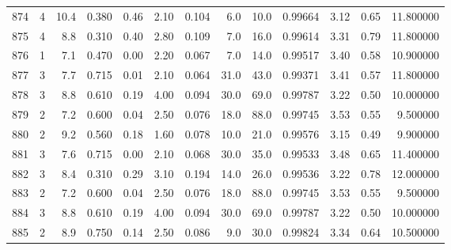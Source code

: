 \begin{tabular}{lrrrrrrrrrrrr}
874  &        4 &           10.4 &             0.380 &         0.46 &            2.10 &      0.104 &                  6.0 &                  10.0 &  0.99664 &  3.12 &       0.65 &  11.800000 \\
875  &        4 &            8.8 &             0.310 &         0.40 &            2.80 &      0.109 &                  7.0 &                  16.0 &  0.99614 &  3.31 &       0.79 &  11.800000 \\
876  &        1 &            7.1 &             0.470 &         0.00 &            2.20 &      0.067 &                  7.0 &                  14.0 &  0.99517 &  3.40 &       0.58 &  10.900000 \\
877  &        3 &            7.7 &             0.715 &         0.01 &            2.10 &      0.064 &                 31.0 &                  43.0 &  0.99371 &  3.41 &       0.57 &  11.800000 \\
878  &        3 &            8.8 &             0.610 &         0.19 &            4.00 &      0.094 &                 30.0 &                  69.0 &  0.99787 &  3.22 &       0.50 &  10.000000 \\
879  &        2 &            7.2 &             0.600 &         0.04 &            2.50 &      0.076 &                 18.0 &                  88.0 &  0.99745 &  3.53 &       0.55 &   9.500000 \\
880  &        2 &            9.2 &             0.560 &         0.18 &            1.60 &      0.078 &                 10.0 &                  21.0 &  0.99576 &  3.15 &       0.49 &   9.900000 \\
881  &        3 &            7.6 &             0.715 &         0.00 &            2.10 &      0.068 &                 30.0 &                  35.0 &  0.99533 &  3.48 &       0.65 &  11.400000 \\
882  &        3 &            8.4 &             0.310 &         0.29 &            3.10 &      0.194 &                 14.0 &                  26.0 &  0.99536 &  3.22 &       0.78 &  12.000000 \\
883  &        2 &            7.2 &             0.600 &         0.04 &            2.50 &      0.076 &                 18.0 &                  88.0 &  0.99745 &  3.53 &       0.55 &   9.500000 \\
884  &        3 &            8.8 &             0.610 &         0.19 &            4.00 &      0.094 &                 30.0 &                  69.0 &  0.99787 &  3.22 &       0.50 &  10.000000 \\
885  &        2 &            8.9 &             0.750 &         0.14 &            2.50 &      0.086 &                  9.0 &                  30.0 &  0.99824 &  3.34 &       0.64 &  10.500000 \\

\end{tabular}
